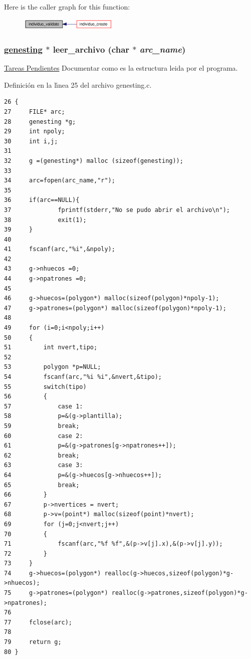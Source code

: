 Here is the caller graph for this function:\begin{figure}[H]
\begin{center}
\leavevmode
\includegraphics[width=133pt]{group__genetic_gf80cc38ea4d590f6c45215f770d63778_gf80cc38ea4d590f6c45215f770d63778_icgraph}
\end{center}
\end{figure}
\hypertarget{group__genetic_g6fed4910dd1f6172bb5a4e35a97bbe56_g6fed4910dd1f6172bb5a4e35a97bbe56}{
\subsubsection[leer\_\-archivo]{\setlength{\rightskip}{0pt plus 5cm}\hyperlink{struct__genesting}{genesting} $\ast$ leer\_\-archivo (char $\ast$ {\em arc\_\-name})}}
\label{group__genetic_g6fed4910dd1f6172bb5a4e35a97bbe56_g6fed4910dd1f6172bb5a4e35a97bbe56}


\begin{Desc}
\item[\hyperlink{todo__todo000001}{Tareas Pendientes}]Documentar como es la estructura leida por el programa. \end{Desc}


Definici\'{o}n en la l\'{\i}nea 25 del archivo genesting.c.

\begin{Code}\begin{verbatim}26 {
27     FILE* arc;
28     genesting *g;
29     int npoly;
30     int i,j;
31 
32     g =(genesting*) malloc (sizeof(genesting));
33 
34     arc=fopen(arc_name,"r");
35 
36     if(arc==NULL){
37             fprintf(stderr,"No se pudo abrir el archivo\n");
38             exit(1);
39     }
40 
41     fscanf(arc,"%i",&npoly);
42 
43     g->nhuecos =0;
44     g->npatrones =0;
45 
46     g->huecos=(polygon*) malloc(sizeof(polygon)*npoly-1);
47     g->patrones=(polygon*) malloc(sizeof(polygon)*npoly-1);
48 
49     for (i=0;i<npoly;i++)
50     {
51         int nvert,tipo;
52 
53         polygon *p=NULL;
54         fscanf(arc,"%i %i",&nvert,&tipo);
55         switch(tipo)
56         {
57             case 1:
58             p=&(g->plantilla);
59             break;
60             case 2:
61             p=&(g->patrones[g->npatrones++]);
62             break;
63             case 3:
64             p=&(g->huecos[g->nhuecos++]);
65             break;
66         }
67         p->nvertices = nvert;
68         p->v=(point*) malloc(sizeof(point)*nvert);
69         for (j=0;j<nvert;j++)
70         {
71             fscanf(arc,"%f %f",&(p->v[j].x),&(p->v[j].y));
72         }
73     }
74     g->huecos=(polygon*) realloc(g->huecos,sizeof(polygon)*g->nhuecos);
75     g->patrones=(polygon*) realloc(g->patrones,sizeof(polygon)*g->npatrones);
76 
77     fclose(arc);
78 
79     return g;
80 }
\end{verbatim}\end{Code}




